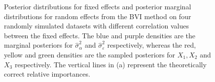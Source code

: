 \begin{figure}[!ht]
  \centering
  \vspace{5mm}

  \caption{Posterior distributions for fixed effects and posterior marginal distributions for random effects from the BVI method on four randomly simulated datasets with different correlation values between the fixed effects. The blue and purple densities are the marginal posteriors for $\hat{\sigma}^2_{\alpha}$ and $\hat{\sigma}^2_{\varepsilon}$ respectively, whereas the red, yellow and green densities are the sampled posteriors for $X_1, X_2$ and $X_3$ respectively. The vertical lines in (a) represent the theoretically correct relative importances.}
  \label{fig:posterior_distributions}
\end{figure}
\newpage
